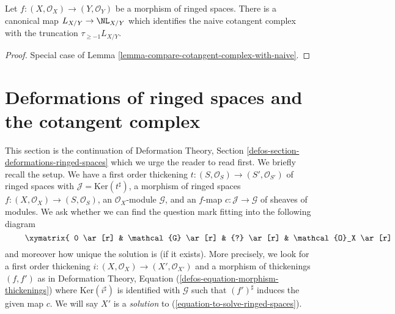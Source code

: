 \begin{lemma}
\label{lemma-compare-cotangent-complex-with-naive-ringed-spaces}
Let $f : (X, \mathcal{O}_X) \to (Y, \mathcal{O}_Y)$ be a morphism of
ringed spaces. There is a canonical map $L_{X/Y} \to \NL_{X/Y}$ which
identifies the naive cotangent complex with the truncation
$\tau_{\geq -1}L_{X/Y}$.
\end{lemma}

\begin{proof}
Special case of Lemma \ref{lemma-compare-cotangent-complex-with-naive}.
\end{proof}






\section{Deformations of ringed spaces and the cotangent complex}
\label{section-deformations-ringed-spaces}

\noindent
This section is the continuation of
Deformation Theory, Section \ref{defos-section-deformations-ringed-spaces}
which we urge the reader to read first. We briefly recall the setup.
We have a first order thickening
$t : (S, \mathcal{O}_S) \to (S', \mathcal{O}_{S'})$ of ringed spaces
with $\mathcal{J} = \text{Ker}(t^\sharp)$, a morphism of ringed spaces
$f : (X, \mathcal{O}_X) \to (S, \mathcal{O}_S)$, an $\mathcal{O}_X$-module
$\mathcal{G}$, and an $f$-map $c : \mathcal{J} \to \mathcal{G}$
of sheaves of modules. We ask whether we can find
the question mark fitting into the following diagram
\begin{equation}
\label{equation-to-solve-ringed-spaces}
\vcenter{
\xymatrix{
0 \ar[r] & \mathcal{G} \ar[r] & {?} \ar[r] & \mathcal{O}_X \ar[r] & 0 \\
0 \ar[r] & \mathcal{J} \ar[u]^c \ar[r] & \mathcal{O}_{S'} \ar[u] \ar[r] &
\mathcal{O}_S \ar[u] \ar[r] & 0
}
}
\end{equation}
and moreover how unique the solution is (if it exists). More precisely,
we look for a first order thickening
$i : (X, \mathcal{O}_X) \to (X', \mathcal{O}_{X'})$
and a morphism of thickenings $(f, f')$ as in
Deformation Theory, Equation (\ref{defos-equation-morphism-thickenings})
where $\text{Ker}(i^\sharp)$ is identified with $\mathcal{G}$
such that $(f')^\sharp$ induces the given map $c$.
We will say $X'$ is a {\it solution} to
(\ref{equation-to-solve-ringed-spaces}).

